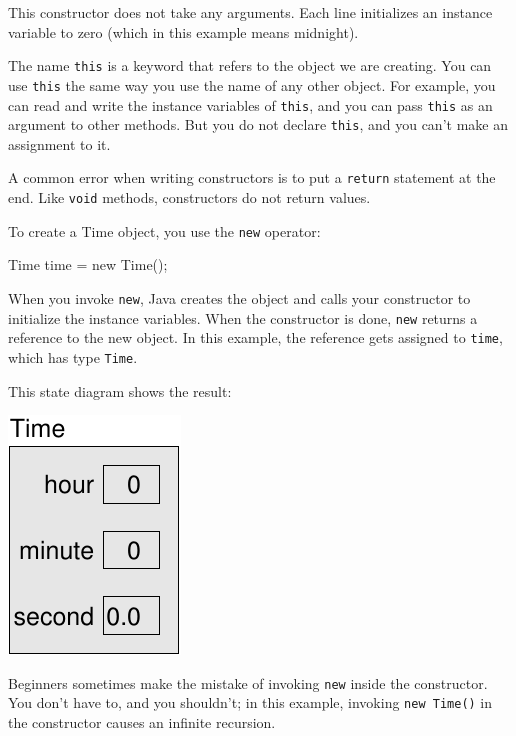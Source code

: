 \documentclass[12pt]{book}
\theoremstyle{exercise}
\newcommand{\java}[1]{\verb"#1"}
\newcommand{\java}[1]{\lstinline{#1}} %
\begin{document}
This constructor does not take any arguments.
Each line initializes an instance variable to zero (which in this example means midnight).


The name \java{this} is a keyword that refers to the object we are creating.
You can use \java{this} the same way you use the name of any other object.
For example, you can read and write the instance variables of \java{this}, and you can pass \java{this} as an argument to other methods.
But you do not declare \java{this}, and you can't make an assignment to it.

A common error when writing constructors is to put a \java{return} statement at the end.
Like \java{void} methods, constructors do not return values.

To create a Time object, you use the \java{new} operator:

\begin{code}
    Time time = new Time();
\end{code}


When you invoke \java{new}, Java creates the object and calls your constructor to initialize the instance variables.
When the constructor is done, \java{new} returns a reference to the new object.
In this example, the reference gets assigned to \java{time}, which has type \java{Time}.

This state diagram shows the result:

\begin{center}
\includegraphics{figs/time.pdf}
\end{center}

Beginners sometimes make the mistake of invoking \java{new} inside the constructor.
You don't have to, and you shouldn't; in this example, invoking \java{new Time()} in the constructor causes an infinite recursion.
\end{document}
